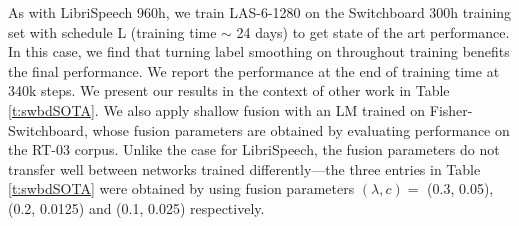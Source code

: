 As with LibriSpeech 960h, we train LAS-6-1280 on the Switchboard 300h training set with schedule L (training time $\sim$ 24 days) to get state of the art performance. In this case, we find that turning label smoothing on throughout training benefits the final performance. We report the performance at the end of training time at 340k steps. We present our results in the context of other work in Table \ref{t:swbdSOTA}.  We also apply shallow fusion with an LM trained on Fisher-Switchboard, whose fusion parameters are obtained by evaluating performance on the RT-03 corpus. Unlike the case for LibriSpeech, the fusion parameters do not transfer well between networks trained differently---the three entries in Table \ref{t:swbdSOTA} were obtained by using fusion parameters $(\lambda, c) = $ (0.3, 0.05), (0.2, 0.0125) and (0.1, 0.025) respectively.


